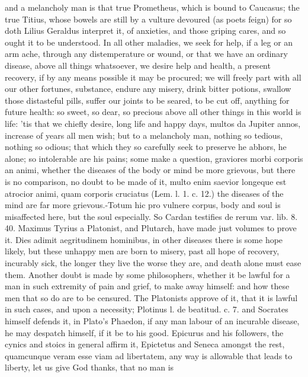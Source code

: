 and a melancholy man is that true Prometheus, which is bound to
Caucasus; the true Titius, whose bowels are still by a vulture devoured
(as poets feign) for so doth Lilius Geraldus interpret it, of
anxieties, and those griping cares, and so ought it to be understood.
In all other maladies, we seek for help, if a leg or an arm ache,
through any distemperature or wound, or that we have an ordinary
disease, above all things whatsoever, we desire help and health, a
present recovery, if by any means possible it may be procured; we will
freely part with all our other fortunes, substance, endure any misery,
drink bitter potions, swallow those distasteful pills, suffer our
joints to be seared, to be cut off, anything for future health: so
sweet, so dear, so precious above all other things in this world is
life: 'tis that we chiefly desire, long life and happy days,
multos da Jupiter annos, increase of years all men wish; but to a
melancholy man, nothing so tedious, nothing so odious; that which they
so carefully seek to preserve he abhors, he alone; so intolerable
are his pains; some make a question, graviores morbi corporis an animi,
whether the diseases of the body or mind be more grievous, but there is
no comparison, no doubt to be made of it, multo enim saevior longeque
est atrocior animi, quam corporis cruciatus (Lem. l. 1. c. 12.) the
diseases of the mind are far more grievous.-Totum hic pro vulnere
corpus, body and soul is misaffected here, but the soul especially. So
Cardan testifies de rerum var. lib. 8. 40. Maximus Tyrius a
Platonist, and Plutarch, have made just volumes to prove it. Dies
adimit aegritudinem hominibus, in other diseases there is some hope
likely, but these unhappy men are born to misery, past all hope of
recovery, incurably sick, the longer they live the worse they are, and
death alone must ease them.
Another doubt is made by some philosophers, whether it be lawful for a
man in such extremity of pain and grief, to make away himself: and how
these men that so do are to be censured. The Platonists approve of it,
that it is lawful in such cases, and upon a necessity; Plotinus l. de
beatitud. c. 7. and Socrates himself defends it, in Plato's Phaedon, if
any man labour of an incurable disease, he may despatch himself, if it
be to his good. Epicurus and his followers, the cynics and stoics in
general affirm it, Epictetus and Seneca amongst the rest,
quamcunque veram esse viam ad libertatem, any way is allowable that
leads to liberty, let us give God thanks, that no man is
